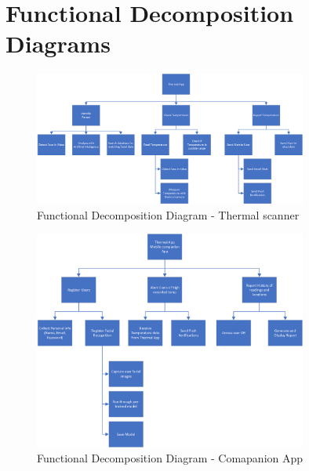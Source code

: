 \documentclass[12pt, letterpaper]{article}
\begin{document}
    \section{Functional Decomposition Diagrams}
    \begin{figure}[h!]
        \centering
        \includegraphics[width=0.8\textwidth]{Function diagram-Thermal App.png}
        \caption{Functional Decomposition Diagram - Thermal scanner}
    \end{figure}
    \begin{figure}[h!]
        \centering
        \includegraphics[width=0.8\textwidth]{Function diagram-Mobile Comapanion App.png}
        \caption{Functional Decomposition Diagram - Comapanion App}
    \end{figure}
    \newpage
\end{document}
